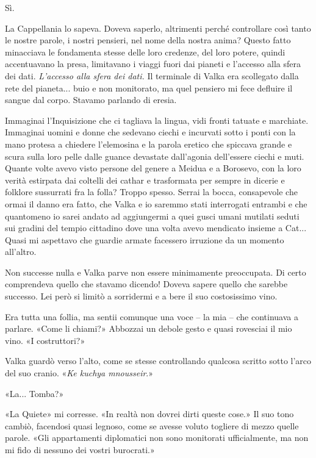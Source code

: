 Sì.

La Cappellania lo sapeva. Doveva saperlo, altrimenti perché controllare
così tanto le nostre parole, i nostri pensieri, nel nome della nostra
anima? Questo fatto minacciava le fondamenta stesse delle loro credenze,
del loro potere, quindi accentuavano la presa, limitavano i viaggi fuori
dai pianeti e l'accesso alla sfera dei dati. \emph{L'accesso alla sfera
	dei dati.} Il terminale di Valka era scollegato dalla rete del
pianeta... buio e non monitorato, ma quel pensiero mi fece defluire il
sangue dal corpo. Stavamo parlando di eresia.

Immaginai l'Inquisizione che ci tagliava la lingua, vidi fronti tatuate
e marchiate. Immaginai uomini e donne che sedevano ciechi e incurvati
sotto i ponti con la mano protesa a chiedere l'elemosina e la parola
\foreignlanguage{italian}{eretico} che spiccava grande e scura sulla
loro pelle dalle guance devastate dall'agonia dell'essere ciechi e muti.
Quante volte avevo visto persone del genere a Meidua e a Borosevo, con
la loro verità estirpata dai coltelli dei cathar e trasformata per
sempre in dicerie e folklore sussurrati fra la folla? Troppo spesso.
Serrai la bocca, consapevole che ormai il danno era fatto, che Valka e
io saremmo stati interrogati entrambi e che quantomeno io sarei andato
ad aggiungermi a quei gusci umani mutilati seduti sui gradini del tempio
cittadino dove una volta avevo mendicato insieme a Cat... Quasi mi
aspettavo che guardie armate facessero irruzione da un momento
all'altro.

Non successe nulla e Valka parve non essere minimamente preoccupata. Di
certo comprendeva quello che stavamo dicendo! Doveva sapere quello che
sarebbe successo. Lei però si limitò a sorridermi e a bere il suo
costosissimo vino.

Era tutta una follia, ma sentii comunque una voce -- la mia -- che
continuava a parlare. «Come li chiami?» Abbozzai un debole gesto e quasi
rovesciai il mio vino. «I costruttori?»

Valka guardò verso l'alto, come se stesse controllando qualcosa scritto
sotto l'arco del suo cranio. «\emph{Ke kuchya mnousseir}.»

«La... Tomba?»

«La Quiete» mi corresse. «In realtà non dovrei dirti queste cose.» Il
suo tono cambiò, facendosi quasi legnoso, come se avesse voluto togliere
di mezzo quelle parole. «Gli appartamenti diplomatici non sono
monitorati ufficialmente, ma non mi fido di nessuno dei vostri
burocrati.»


